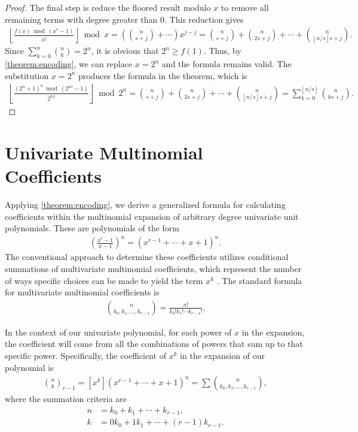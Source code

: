 \documentclass[10pt,a4paper]{article}
\theoremstyle{plain}
\newcommand{\floor}[1]{\left\lfloor #1 \right\rfloor}
\begin{document}
\begin{proof}
The final step is reduce the floored result modulo $x$ to remove all remaining terms with degree greater than $0$. This reduction gives
\begin{align*}
\floor{\frac{f(x) \bmod(x^s-1)}{x^j}} \bmod x
= \left(\binom{n}{s+j} + \cdots \right) x^{j-j}
= \binom{n}{s+j} + \binom{n}{2s+j} + \cdots + \binom{n}{\floor{n/s}s+j}
.
\end{align*}
Since $\sum_{k=0}^{n} \binom{n}{k} = 2^n$, it is obvious that $2^n \geq f(1)$. Thus, by \cref{theorem:encoding}, we can replace $x=2^n$ and the formula remains valid. The substitution $x=2^n$ produces the formula in the theorem, which is
\begin{align*}
\floor{\frac{(2^n+1)^n \bmod(2^{ns}-1)}{2^{nj}}} \bmod 2^n
= \binom{n}{s+j} + \binom{n}{2s+j} + \cdots + \binom{n}{\floor{n/s}s+j}
= \sum_{k=0}^{\floor{n/s}} \binom{n}{ks+j} .
\end{align*}
\end{proof}

\section{Univariate Multinomial Coefficients} \label{section:multinomialformula}
Applying \cref{theorem:encoding}, we derive a generalized formula for calculating coefficients within the multinomial expansion of arbitrary degree univariate unit polynomials. These are polynomials of the form
\begin{align*}
    \left(\frac{x^{r}-1}{x-1}\right)^n = (x^{r-1} + \cdots + x + 1)^n  .
\end{align*}
The conventional approach to determine these coefficients utilizes conditional summations of multivariate multinomial coefficients, which represent the number of ways specific choices can be made to yield the term \(x^k\) \cite{graham1994concrete}. The standard formula for multivariate multinomial coefficients is
\begin{align*}
    \binom{n}{k_0, k_1, \ldots, k_{r-1}} = \frac{n!}{k_0! k_1! \cdots k_{r-1}!} .
\end{align*}

In the context of our univariate polynomial, for each power of \(x\) in the expansion, the coefficient will come from all the combinations of powers that sum up to that specific power. Specifically, the coefficient of \(x^k\) in the expansion of our polynomial is \cite{brualdi2010intro}
\begin{align*}
    \binom{n}{k}_{r-1} = [x^k](x^{r-1} + \cdots + x + 1)^n = \sum \binom{n}{k_0, k_1, \ldots, k_{r-1}} ,
\end{align*}
where the summation criteria are
\begin{align*}
    n &= k_0 + k_1 + \cdots + k_{r-1},
    \\
    k &= 0 k_0 + 1 k_1 + \cdots + (r-1) k_{r-1}.
\end{align*}
\end{document}

